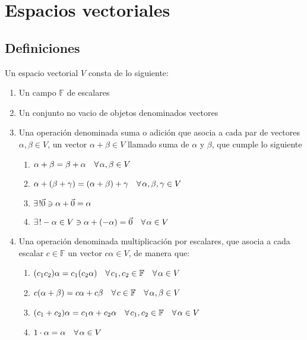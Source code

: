 
\section{Espacios vectoriales}

	\subsection{Definiciones}

		\begin{definicion}
			Un espacio vectorial $V$ consta de lo siguiente:

			\begin{enumerate}
				\item Un campo $\mathbb{F}$ de escalares
				\item Un conjunto no vacio de objetos denominados vectores
				\item Una operación denominada suma o adición que asocia a cada par de vectores $\alpha, \beta \in V$, un vector $\alpha + \beta \in V$ llamado suma de $\alpha$ y $\beta$, que cumple lo siguiente
				\begin{enumerate}
					\item $\alpha + \beta = \beta + \alpha \quad \forall \mkern2mu \alpha, \beta \in V$
					\item $\alpha + (\beta + \gamma) = (\alpha + \beta) + \gamma \quad \forall \mkern2mu \alpha, \beta, \gamma \in V$
					\item $\exists \mkern2mu ! \vec{0} \ni \alpha + \vec{0} = \alpha$
					\item $\exists \mkern2mu ! - \alpha \in V \ni \alpha + (-\alpha) = \vec{0} \quad \forall \mkern2mu \alpha \in V$
				\end{enumerate}
				\item Una operación denominada multiplicación por escalares, que asocia a cada escalar $c \in \mathbb{F}$ un vector $c \alpha \in V$, de manera que:
				\begin{enumerate}
					\item $(c_1 c_2) \alpha = c_1 (c_2 \alpha) \quad \forall \mkern2mu c_1, c_2 \in \mathbb{F} \quad \forall \mkern2mu \alpha \in V$
					\item $c(\alpha + \beta) = c \alpha + c \beta \quad \forall \mkern2mu c \in \mathbb{F} \quad \forall \mkern2mu \alpha, \beta \in V$
					\item $(c_1 + c_2) \alpha = c_1 \alpha + c_2 \alpha \quad \forall \mkern2mu c_1, c_2 \in \mathbb{F} \quad \forall \mkern2mu \alpha \in V$
					\item $1 \cdot \alpha = \alpha \quad \forall \mkern2mu \alpha \in V$
				\end{enumerate}
			\end{enumerate}
		\end{definicion}

